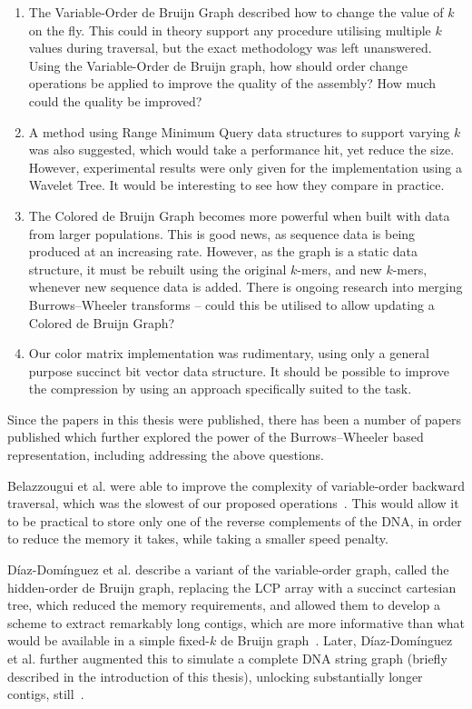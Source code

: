 \begin{enumerate}
\item The Variable-Order de Bruijn Graph described how to change the value of $k$ on the fly. This could in theory support any procedure utilising multiple $k$ values during traversal, but the exact methodology was left unanswered. Using the Variable-Order de Bruijn graph, how should order change operations be applied to improve the quality of the assembly? How much could the quality be improved?
  
\item A method using Range Minimum Query data structures to support varying $k$ was also suggested, which would take a performance hit, yet reduce the size. However, experimental results were only given for the implementation using a Wavelet Tree. It would be interesting to see how they compare in practice.
  
\item The Colored de Bruijn Graph becomes more powerful when built with data from larger populations. This is good news, as sequence data is being produced at an increasing rate. However, as the graph is a static data structure, it must be rebuilt using the original $k$-mers, and new $k$-mers, whenever new sequence data is added. There is ongoing research into merging Burrows--Wheeler transforms -- could this be utilised to allow updating a Colored de Bruijn Graph?
  
\item Our color matrix implementation was rudimentary, using only a general purpose succinct bit vector data structure. It should be possible to improve the compression by using an approach specifically suited to the task.
\end{enumerate}

Since the papers in this thesis were published, there has been a number of papers published which further explored the power of the Burrows--Wheeler based representation, including addressing the above questions.

Belazzougui et al. were able to improve the complexity of variable-order backward traversal, which was the slowest of our proposed operations~\cite{Bel18}. This would allow it to be practical to store only one of the reverse complements of the DNA, in order to reduce the memory it takes, while taking a smaller speed penalty.

Díaz-Domínguez et al. describe a variant of the variable-order graph, called the hidden-order de Bruijn graph, replacing the LCP array with a succinct cartesian tree, which reduced the memory requirements, and allowed them to develop a scheme to extract remarkably long contigs, which are more informative than what would be available in a simple fixed-$k$ de Bruijn graph~\cite{Dia18}. Later, Díaz-Domínguez {et al}. further augmented this to simulate a complete DNA string graph (briefly described in the introduction of this thesis), unlocking substantially longer contigs, still~\cite{}.

